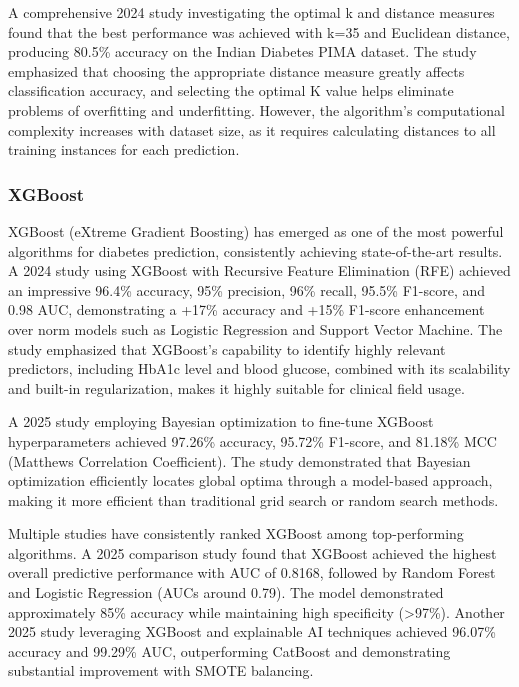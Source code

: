 A comprehensive 2024 study investigating the optimal k and distance measures found that the best performance was achieved with k=35 and Euclidean distance, producing 80.5\% accuracy on the Indian Diabetes PIMA dataset. The study emphasized that choosing the appropriate distance measure greatly affects classification accuracy, and selecting the optimal K value helps eliminate problems of overfitting and underfitting. However, the algorithm's computational complexity increases with dataset size, as it requires calculating distances to all training instances for each prediction.

\subsubsection{XGBoost}

XGBoost (eXtreme Gradient Boosting) has emerged as one of the most powerful algorithms for diabetes prediction, consistently achieving state-of-the-art results. A 2024 study using XGBoost with Recursive Feature Elimination (RFE) achieved an impressive 96.4\% accuracy, 95\% precision, 96\% recall, 95.5\% F1-score, and 0.98 AUC, demonstrating a +17\% accuracy and +15\% F1-score enhancement over norm models such as Logistic Regression and Support Vector Machine. The study emphasized that XGBoost's capability to identify highly relevant predictors, including HbA1c level and blood glucose, combined with its scalability and built-in regularization, makes it highly suitable for clinical field usage.

A 2025 study employing Bayesian optimization to fine-tune XGBoost hyperparameters achieved 97.26\% accuracy, 95.72\% F1-score, and 81.18\% MCC (Matthews Correlation Coefficient). The study demonstrated that Bayesian optimization efficiently locates global optima through a model-based approach, making it more efficient than traditional grid search or random search methods.

Multiple studies have consistently ranked XGBoost among top-performing algorithms. A 2025 comparison study found that XGBoost achieved the highest overall predictive performance with AUC of 0.8168, followed by Random Forest and Logistic Regression (AUCs around 0.79). The model demonstrated approximately 85\% accuracy while maintaining high specificity (>97\%). Another 2025 study leveraging XGBoost and explainable AI techniques achieved 96.07\% accuracy and 99.29\% AUC, outperforming CatBoost and demonstrating substantial improvement with SMOTE balancing.


